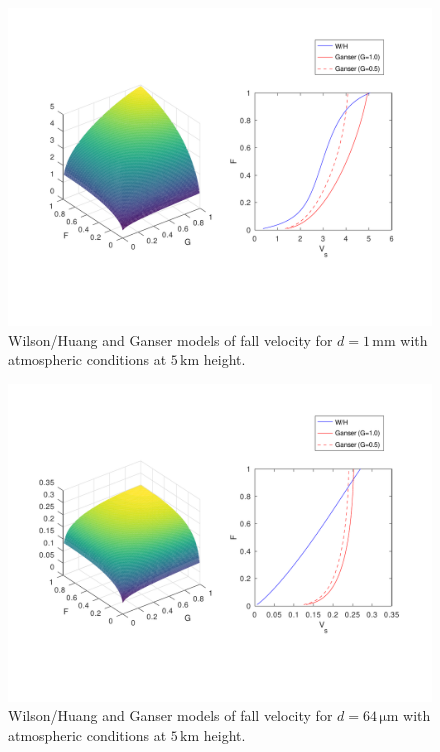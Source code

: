 \begin{figure}[htbp]
\includegraphics[angle=0,scale=0.6]{Figures/Scripts/FallMech/FigFVd500.pdf}
\parbox{15cm}{\caption{\label{FigFVd500}
Wilson/Huang and Ganser models of fall velocity for $d=1\,\mathrm{mm}$
with atmospheric conditions at $5\,\mathrm{km}$ height.}}
\end{figure}
\begin{figure}[htbp]
\includegraphics[angle=0,scale=0.6]{Figures/Scripts/FallMech/FigFVd064.pdf}
\parbox{15cm}{\caption{\label{FigFVd500}
Wilson/Huang and Ganser models of fall velocity for $d=64\,\mathrm{\mu m}$
with atmospheric conditions at $5\,\mathrm{km}$ height.}}
\end{figure}



